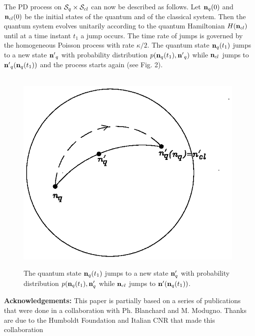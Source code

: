 \documentclass[12pt]{article}
\begin{document}
The PD process on ${\cal S}_q\times {\cal S}_{cl}$ can now be
described as follows.  Let ${\bf n}_q (0)$ and ${\bf n}_{cl} (0)$ be the
initial states of the quantum and of the classical system.  Then the
quantum system evolves unitarily according to the quantum Hamiltonian
$H ({\bf n}_{cl})$ until at a time instant $t_1$ a jump occurs.  The time
rate of jumps is governed by the homogeneous Poisson process with rate
$\kappa/2$.  The quantum state ${\bf n}_q (t_1)$ jumps to a new state
${{\bf n}'}_q$ with probability distribution $p ({\bf n}_q (t_1), {{\bf
n}'}_q)$ while ${\bf n}_{cl}$ jumps to ${{\bf n}'}_q  ({\bf n}_q (t_1))$
and the process starts again (see Fig. 2). 
\\ \\
\begin{figure}[hbt]
\begin{center}
{\includegraphics{jadfig2.ps}}
\end{center}
\caption{The quantum state ${\bf n}_{q} (t_{1})$ jumps to a new state
${\bf n}^{\prime}_{q}$  with probability distribution 
$p ({\bf n}_{q} (t_{1}), {\bf n}^{\prime}_{q}$ while ${\bf n}_{cl}$
jumps to ${\bf n}^{\prime} ({\bf n}_{q} (t_{1}))$. }
\end{figure}
\vspace{1cm}
\newpage
\noindent
{\bf Acknowledgements: }
This paper is partially based on a series of publications that were 
done in a
collaboration with Ph.  Blanchard and M.  Modugno.  Thanks are due to
the Humboldt Foundation and Italian CNR that made this collaboration
\end{document}

